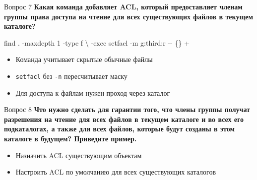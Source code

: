 \documentclass[
  ignorenonframetext,
  aspectratio=169,
  russian,
]{beamer}
\newenvironment{Shaded}{\begin{snugshade}}{\end{snugshade}}
\newcommand{\AttributeTok}[1]{\textcolor[rgb]{0.40,0.45,0.13}{#1}}
\newcommand{\DataTypeTok}[1]{\textcolor[rgb]{0.68,0.00,0.00}{#1}}
\newcommand{\FunctionTok}[1]{\textcolor[rgb]{0.28,0.35,0.67}{#1}}
\newcommand{\NormalTok}[1]{\textcolor[rgb]{0.00,0.23,0.31}{#1}}
\providecommand{\tightlist}{%
  \setlength{\itemsep}{0pt}\setlength{\parskip}{0pt}}
\begin{document}
\begin{frame}[fragile]{Вопрос 7}
\protect{}\label{ux432ux43eux43fux440ux43eux441-7}
\textbf{Какая команда добавляет ACL, который предоставляет членам группы
права доступа на чтение для всех существующих файлов в текущем
каталоге?}

\begin{Shaded}
\begin{Highlighting}[]
\FunctionTok{find}\NormalTok{ . }\AttributeTok{{-}maxdepth}\NormalTok{ 1 }\AttributeTok{{-}type}\NormalTok{ f }\DataTypeTok{\textbackslash{}}
  \AttributeTok{{-}exec}\NormalTok{ setfacl }\AttributeTok{{-}m}\NormalTok{ g:third:r }\AttributeTok{{-}{-}}\NormalTok{ \{\} +}
\end{Highlighting}
\end{Shaded}

\begin{itemize}
\tightlist
\item
  Команда учитывает скрытые обычные файлы
\item
  \texttt{setfacl} без \texttt{-n} пересчитывает маску
\item
  Для доступа к файлам нужен проход через каталог
\end{itemize}
\end{frame}

\begin{frame}{Вопрос 8}
\protect{}\label{ux432ux43eux43fux440ux43eux441-8}
\textbf{Что нужно сделать для гарантии того, что члены группы получат
разрешения на чтение для всех файлов в текущем каталоге и во всех его
подкаталогах, а также для всех файлов, которые будут созданы в этом
каталоге в будущем? Приведите пример.}

\begin{itemize}
\tightlist
\item
  Назначить ACL существующим объектам
\item
  Настроить ACL по умолчанию для всех существующих каталогов
\end{itemize}
\end{frame}
\end{document}
